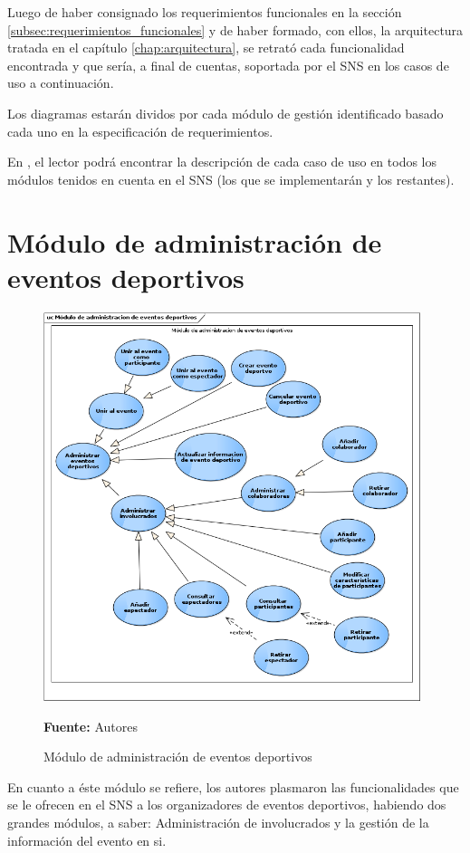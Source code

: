 Luego de haber consignado los requerimientos funcionales en la sección \ref{subsec:requerimientos_funcionales} y de haber formado, con ellos, la arquitectura tratada en el capítulo \ref{chap:arquitectura}, se retrató cada funcionalidad encontrada y que sería, a final de cuentas, soportada por el SNS en los casos de uso a continuación.

Los diagramas estarán dividos por cada módulo de gestión identificado basado cada uno en la especificación de requerimientos.

En \cite{anexos_tesis}, el lector podrá encontrar la descripción de cada caso de uso en todos los módulos tenidos en cuenta en el SNS (los que se implementarán y los restantes).

\section{Módulo de administración de eventos deportivos}

\begin{figure}[!htb]
  \begin{center}
    \includegraphics[width=11cm]{./imagenes/casos_uso/gestion_evento.png}
    \caption{Módulo de administración de eventos deportivos}
    \label{fig:cu_admin_eve}
    \textbf{Fuente:} Autores \\
  \end{center}
\end{figure}

En cuanto a éste módulo se refiere, los autores plasmaron las funcionalidades que se le ofrecen en el SNS a los organizadores de eventos deportivos, habiendo dos grandes módulos, a saber: Administración de involucrados y la gestión de la información del evento en si.

